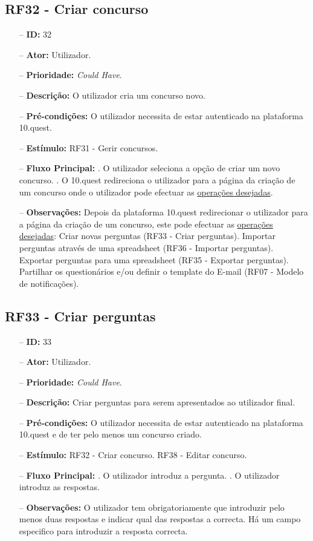 \subsection{RF32 - Criar concurso}
\begin{itemize}
	\item[--] \textbf{ID:} 32
	\item[--]  \textbf{Ator:} Utilizador.
	\item[--]  \textbf{Prioridade:} \textit{Could Have}.
	\item[--]  \textbf{Descrição:} O utilizador cria um concurso novo.
	\item[--]  \textbf{Pré-condições:} O utilizador necessita de estar autenticado na plataforma 10.quest.
	\item[--]  \textbf{Estímulo:} RF31 - Gerir concursos.
	\item[--]  \textbf{Fluxo Principal:} 
	. O utilizador seleciona a opção de criar um novo concurso.
	. O 10.quest redireciona o utilizador para a página da criação de um concurso onde o utilizador pode efectuar as \underline{operações desejadas}.
	\item[--]  \textbf{Observações:} Depois da plataforma 10.quest redirecionar o utilizador para a página da criação de um concurso, este pode efectuar as \underline{operações desejadas}:
	\subitem Criar novas perguntas (RF33 - Criar perguntas).
	\subitem Importar perguntas através de uma spreadsheet (RF36 - Importar perguntas).
	\subitem Exportar perguntas para uma spreadsheet (RF35 - Exportar perguntas).
	\subitem Partilhar os questionários e/ou definir o template do E-mail (RF07 - Modelo de notificações).
\end{itemize}
\newpage

\subsection{RF33 - Criar perguntas}
\begin{itemize}
	\item[--] \textbf{ID:} 33
	\item[--]  \textbf{Ator:} Utilizador.
	\item[--]  \textbf{Prioridade:} \textit{Could Have}.
	\item[--]  \textbf{Descrição:} Criar perguntas para serem apresentados ao utilizador final.
	\item[--]  \textbf{Pré-condições:} O utilizador necessita de estar autenticado na plataforma 10.quest e de ter pelo menos um concurso criado.
	\item[--]  \textbf{Estímulo:}  
	\subitem RF32 - Criar concurso.
	\subitem RF38 - Editar concurso.
	\item[--]  \textbf{Fluxo Principal:} 
	. O utilizador introduz a pergunta.
	. O utilizador introduz as respostas.
	\item[--]  \textbf{Observações:} O utilizador tem obrigatoriamente que introduzir pelo menos duas respostas e indicar qual das respostas a correcta. Há um campo especifico para introduzir a resposta correcta.
\end{itemize}
\newpage

